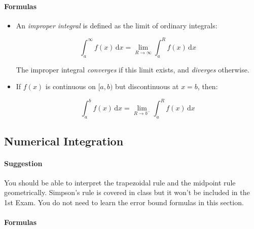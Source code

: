 \documentclass[11pt]{article}
\begin{document}
		
		\paragraph{Formulas}
		
		\begin{itemize}
			\item An \emph{improper integral} is defined as the limit of ordinary integrals:
			
			\begin{equation*}
				\int_a^\infty \! f(x) \, \mathrm{d}x = \lim_{R\to\infty}\int_a^R \! f(x) \, \mathrm{d}x
			\end{equation*}
			
			The improper integral \emph{converges} if this limit exists, and \emph{diverges} otherwise.
			
			\item If $f(x)$ is continuous on $[a, b)$ but discontinuous at $x = b$, then:
				
				\begin{equation*}
					\int_a^b \! f(x) \, \mathrm{d}x = \lim_{R\to b^{-}}\int_a^R \! f(x) \, \mathrm{d}x
				\end{equation*}
			
		\end{itemize}
	
	\pagebreak
	\setcounter{subsection}{7}
	\subsection{Numerical Integration}

		\paragraph{Suggestion}
		You should be able to interpret the trapezoidal rule and the midpoint rule geometrically. Simpson's rule is covered in class but it won't be included in the 1st Exam. You do not need to learn the error bound formulas in this section.
		
		\paragraph{Formulas}
		
\end{document}
